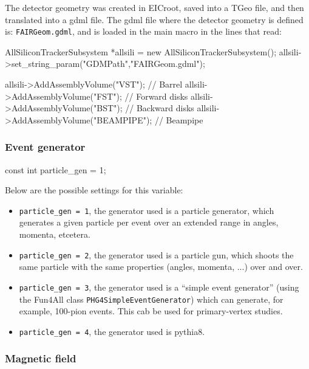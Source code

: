 \documentclass[12pt]{article}
\begin{document}
The detector geometry was created in EICroot, saved into a TGeo file, and then translated into a gdml file. The gdml
file where the detector geometry is defined is: \verb|FAIRGeom.gdml|, and is loaded in the main macro in the lines that read:

\begin{tcolorbox}
\begin{verbnobox}[\scriptsize]
AllSiliconTrackerSubsystem *allsili = new AllSiliconTrackerSubsystem();
allsili->set_string_param("GDMPath","FAIRGeom.gdml");

allsili->AddAssemblyVolume("VST");      // Barrel
allsili->AddAssemblyVolume("FST");      // Forward disks
allsili->AddAssemblyVolume("BST");      // Backward disks
allsili->AddAssemblyVolume("BEAMPIPE"); // Beampipe
\end{verbnobox}
\end{tcolorbox}
	
\subsubsection{Event generator}

\begin{tcolorbox}
\begin{verbnobox}[\scriptsize]
const int particle_gen = 1;
\end{verbnobox}
\end{tcolorbox}

Below are the possible settings for this variable:

\begin{itemize}
\item \verb|particle_gen = 1|, the generator used is a particle generator, which generates a given particle per event over an extended range in angles, momenta, etcetera.
\item \verb|particle_gen = 2|, the generator used is a particle gun, which shoots the same particle with the same properties (angles, momenta, ...) over and over. 
\item \verb|particle_gen = 3|, the generator used is a ``simple event generator'' (using the Fun4All class \verb|PHG4SimpleEventGenerator|) which can generate, for example, 100-pion events.
This cab be used for primary-vertex studies.
\item \verb|particle_gen = 4|, the generator used is pythia8.
\end{itemize}

\subsubsection{Magnetic field}
\end{document}

